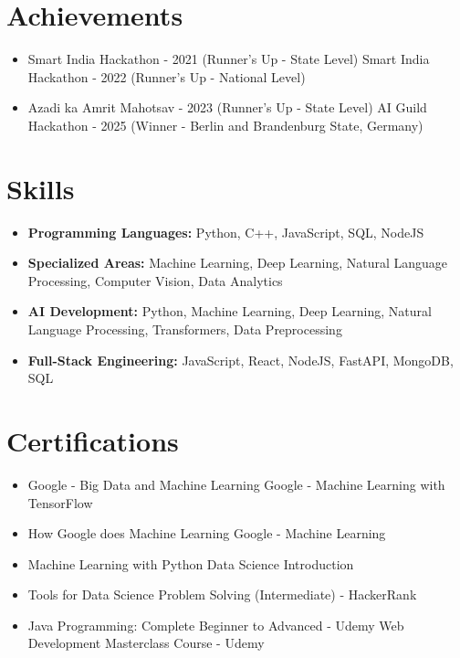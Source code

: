 \documentclass[a4paper,10pt]{article}
\begin{document}
\section*{Achievements}
\begin{itemize}
\item Smart India Hackathon - 2021 (Runner's Up - State Level) \hfill Smart India Hackathon - 2022 (Runner's Up - National Level)
\item Azadi ka Amrit Mahotsav - 2023 (Runner's Up - State Level) \hfill AI Guild Hackathon - 2025 (Winner - Berlin and Brandenburg State, Germany)
\end{itemize}

\section*{Skills}
\begin{itemize}
  \item \textbf{Programming Languages:} Python, C++, JavaScript, SQL, NodeJS
  \item \textbf{Specialized Areas:} Machine Learning, Deep Learning, Natural Language Processing, Computer Vision, Data Analytics
  \item \textbf{AI Development:} Python, Machine Learning, Deep Learning, Natural Language Processing, Transformers, Data Preprocessing
  \item \textbf{Full-Stack Engineering:} JavaScript, React, NodeJS, FastAPI, MongoDB, SQL
\end{itemize}

\section*{Certifications}
\begin{itemize}
\item Google - Big Data and Machine Learning \hfill Google - Machine Learning with TensorFlow
\item How Google does Machine Learning \hfill Google - Machine Learning
\item Machine Learning with Python \hfill Data Science Introduction
\item Tools for Data Science \hfill Problem Solving (Intermediate) - HackerRank
\item Java Programming: Complete Beginner to Advanced - Udemy \hfill Web Development Masterclass Course - Udemy
\end{itemize}
\end{document}
